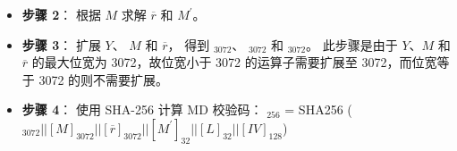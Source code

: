 \documentclass[main\_\_CN.tex]{subfiles}
\begin{document}
\begin{itemize}
    \item {\bfseries 步骤 2}：
          根据 \begin{math}M\end{math} 求解 \begin{math}\overline{r}\end{math} 和 \begin{math}M^{\prime} \end{math}。

    \item {\bfseries 步骤 3}：
          扩展 \begin{math}Y\end{math}、
               \begin{math}M\end{math} 和
               \begin{math}\overline{r}\end{math}，
          得到 \begin{math}[Y]_{3072}\end{math}、
               \begin{math}[M]_{3072}\end{math} 和
               \begin{math}[\overline{r}]_{3072}\end{math}。
          此步骤是由于 \begin{math}Y\end{math}、\begin{math}M\end{math} 和 \begin{math}\overline{r}\end{math} 的最大位宽为 3072，故位宽小于 3072 的运算子需要扩展至 3072，而位宽等于 3072 的则不需要扩展。


    \item {\bfseries 步骤 4}：
            使用 SHA-256 计算 MD 校验码：
                \begin{math}[MD]_{256}\end{math} = SHA256 (\begin{math}
                [Y]_{3072} ||
                [M]_{3072} ||
                [\overline{r}]_{3072} ||
                [M^{\prime}]_{32} ||
                [L]_{32} ||
                [IV]_{128}
            \end{math})


\end{itemize}
\end{document}
